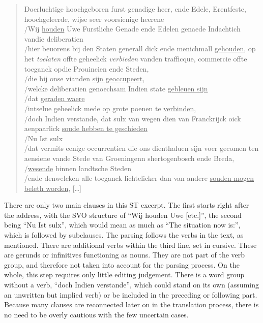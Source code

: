 \begin{paper}
\begin{quote}
Doerluchtige hoochgeboren furst genadige heer, ende Edele, Erentfeste,
hoochgeleerde, wijse seer voorsienige heerene\\
/Wij \underline{houden} Uwe Furstliche Genade ende Edelen genaede Indachtich
vandie deliberatien\\
/hier beuorens bij den Staten generall dick ende menichmall \underline{gehouden},
op het \emph{toelaten} offte geheelick \emph{verbieden} vanden
trafficque, commercie offte toeganck opdie Prouincien ende Steden,\\
/die bij onse vianden \underline{sijn geoccupeert},\\
/welcke deliberatien genoechsam Indien state \underline{gebleuen sijn}\\
/dat \underline{geraden waere}\\
/intselue geheelick mede op grote poenen te \underline{verbinden},\\
/doch Indien verstande, dat sulx van wegen dien van Franckrijck oick
aenpaarlick \underline{soude hebben te geschieden}\\
/Nu {Ist} sulx\\
/dat vermits eenige occurrentien die ons dienthaluen {sijn voer gecomen}
ten aensiene vande Stede van Groeningenn shertogenbosch ende Breda,\\
/\underline{wesende} binnen landtsche Steden\\
/ende denwelcken alle toeganck lichtelicker dan van andere \underline{souden mogen
beleth worden}, {[}\ldots{}{]}
\end{quote}

\noindent There are only two main clauses in this ST excerpt. The first starts
right after the address, with the SVO structure of ``Wij houden Uwe
{[}etc.{]}'', the second being ``Nu Ist sulx'', which would mean as much
as ``The situation now is:'', which is followed by subclauses. The parsing
follows the verbs in the text, as mentioned. There are additional verbs
within the third line, set in cursive. These are gerunds or infinitives
functioning as nouns. They are not part of the verb group, and therefore
not taken into account for the parsing process. On the whole, this step
requires only little editing judgement. There is a word group without a
verb, ``doch Indien verstande'', which could stand on its own (assuming
an unwritten but implied verb) or be included in the preceding or
following part. Because many clauses are reconnected later on in the
translation process, there is no need to be overly cautious with the few
uncertain cases.


\end{paper}
